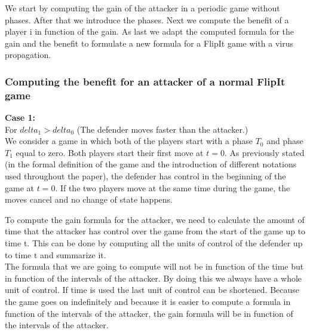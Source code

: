  
%
%


We  start by computing the gain of the attacker in a periodic game without phases. After that we introduce the phases. Next we compute the benefit of a player i in function of the gain. As last we adapt the computed formula for the gain and the benefit to formulate a new formula for a FlipIt game with a virus propagation. 
\\
\subsubsection{Computing the benefit for an attacker of a normal FlipIt game}
\textbf{Case  1:} \\
For $delta_{1} > delta_{0}$ (The defender moves faster than the attacker.) \\

We consider a game in which both of the players start with a phase $T_{0}$ and phase $T_{1}$ equal to zero. Both players start their first move at $t=0$. As previously stated (in the formal definition of the game and the introduction of different notations used throughout the paper), the defender has control in the beginning of the game at $t=0$. If the two players move at the same time during the game, the moves cancel and no change of state happens. \\ 

To compute the gain formula for the attacker, we need to calculate the amount of time that the attacker has control over the game from the start of the game up to time t. This can be done by computing all the units of control of the defender up to time t  and summarize it. \\
The formula that we are going to compute will not be in function of the time but in function of the intervals of the attacker. By doing this we always have a whole unit of control. If time is used the last unit of control can be shortened. Because the game goes on indefinitely and because it is easier to compute a formula in function of the intervals of the attacker, the gain formula will be in function of the intervals of the attacker. 

